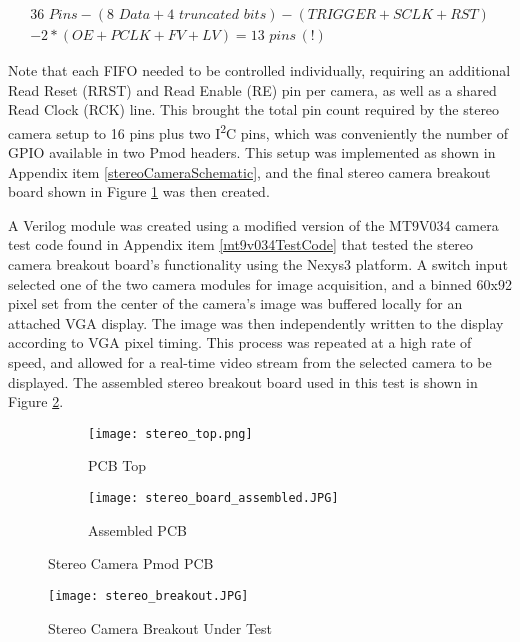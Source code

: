 \begin{equation}
\label{lowerPincount}
\begin{split}
36\,\, Pins - (8\,\,Data + 4 \,\,truncated\,\,bits) - (TRIGGER+SCLK+RST) \\ - 2*(OE+PCLK+FV+LV) = 13\,\,pins\,(!) 
\end{split}
\end{equation}
\par
Note that each FIFO needed to be controlled individually, requiring an additional Read Reset (RRST) and Read Enable (RE) pin per camera, as well as a shared Read Clock (RCK) line. This brought the total pin count required by the stereo camera setup to 16 pins plus two I\textsuperscript{2}C pins, which was conveniently the number of GPIO available in two Pmod headers. This setup was implemented as shown in Appendix item \ref{stereoCameraSchematic}, and the final stereo camera breakout board shown in Figure \ref{stereoCameraBoard} was then created.  
\par
A Verilog module was created using a modified version of the MT9V034 camera test code found in Appendix item \ref{mt9v034TestCode} that tested the stereo camera breakout board's functionality using the Nexys3 platform. A switch input selected one of the two camera modules for image acquisition, and a binned 60x92 pixel set from the center of the camera's image was buffered locally for an attached VGA display. The image was then independently written to the display according to VGA pixel timing. This process was repeated at a high rate of speed, and allowed for a real-time video stream from the selected camera to be displayed. The assembled stereo breakout board used in this test is shown in Figure \ref{stereoTestSetup}.
\begin{figure}[H] 
	\begin{subfigure}{1\textwidth}
	\centering
		\texttt{[image: stereo\_top.png]}
		\caption{PCB Top}
	\end{subfigure}
	\begin{subfigure}{1\textwidth}
	\centering
		\texttt{[image: stereo\_board\_assembled.JPG]}
		\caption{Assembled PCB}
	\end{subfigure}
	\caption{Stereo Camera Pmod PCB}
	\label{stereoCameraBoard}
\end{figure}
\par
\begin{figure}[H] 
	\centering
	\texttt{[image: stereo\_breakout.JPG]}
	\caption{Stereo Camera Breakout Under Test}
	\label{stereoTestSetup}
\end{figure}

